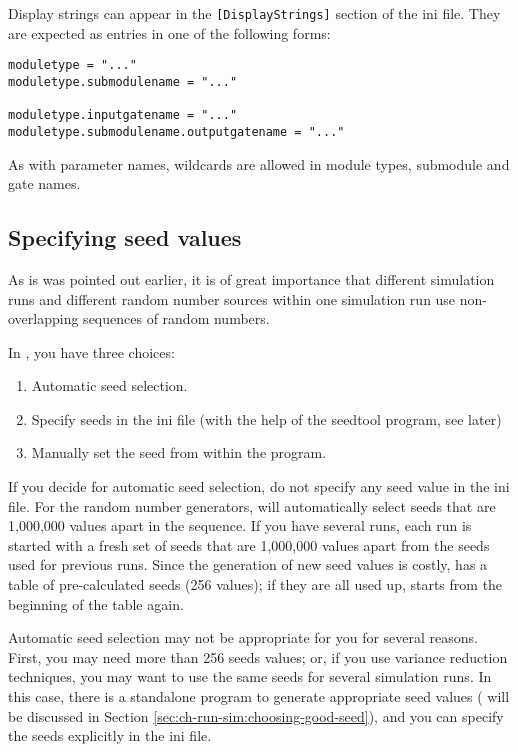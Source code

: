 Display strings can appear in the \texttt{[DisplayStrings]} section of
the ini file. They are expected as entries in one of the following
forms:

\begin{verbatim}
moduletype = "..."
moduletype.submodulename = "..."

moduletype.inputgatename = "..."
moduletype.submodulename.outputgatename = "..."
\end{verbatim}

As with parameter names, wildcards
are allowed in module types, submodule and gate names.


\subsection{Specifying seed values}

As is was pointed out earlier, it is of great importance that
different simulation runs and different random number sources
within one simulation run use non-overlapping sequences of random
numbers.


In {\opp}, you have three choices:
\begin{enumerate}
  \item{Automatic seed selection.}
  \item{Specify seeds in the ini file (with the help of the seedtool
    program, see later)}
  \item{Manually set the seed from within the program.}
\end{enumerate}

If you decide for automatic seed selection, do not specify any seed value in the ini file. For the
random number generators, {\opp} will automatically select seeds that
are 1,000,000 values apart in the sequence. If you have several runs,
each run is started with a fresh set of seeds that are 1,000,000
values apart from the seeds used for previous runs. Since the
generation of new seed values is costly, {\opp} has a table of
pre-calculated seeds (256 values); if they are all used up, {\opp}
starts from the beginning of the table again.


Automatic seed selection may not be appropriate for you for several
reasons. First, you may need more than 256 seeds values; or, if you
use variance reduction techniques, you may want to use the same seeds
for several simulation runs. In this case, there is a standalone
program to generate appropriate seed values ( will be
discussed in Section \ref{sec:ch-run-sim:choosing-good-seed}), and you
can specify the seeds explicitly in the ini file.


